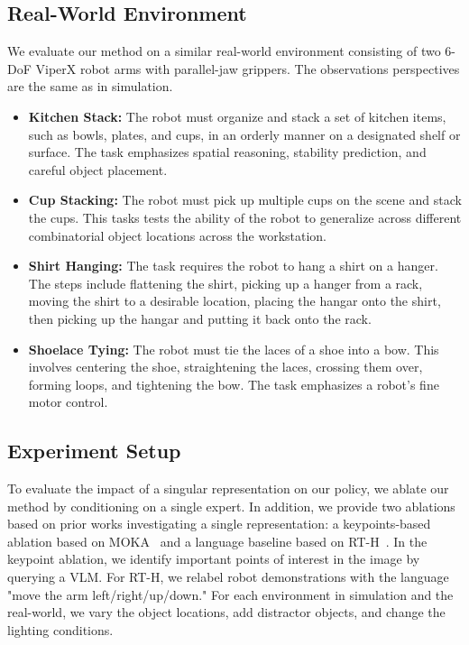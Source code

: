 \documentclass[conference,dvipsnames]{IEEEtran}
\begin{document}
\subsection{Real-World Environment}
We evaluate our method on a similar real-world environment consisting of two 6-DoF ViperX robot arms with parallel-jaw grippers. The observations perspectives are the same as in simulation. 


\begin{itemize}
    \item \textbf{Kitchen Stack:} The robot must organize and stack a set of kitchen items, such as bowls, plates, and cups, in an orderly manner on a designated shelf or surface. The task emphasizes spatial reasoning, stability prediction, and careful object placement.

    \item \textbf{Cup Stacking:}  The robot must pick up multiple cups on the scene and stack the cups. This tasks tests the ability of the robot to generalize across different combinatorial object locations across the workstation.
    
    \item \textbf{Shirt Hanging:}  The task requires the robot to hang a shirt on a hanger. The steps include flattening the shirt, picking up a hanger from a rack, moving the shirt to a desirable location, placing the hangar onto the shirt, then picking up the hangar and putting it back onto the rack.

    \item \textbf{Shoelace Tying:} The robot must tie the laces of a shoe into a bow. This involves centering the shoe, straightening the laces, crossing them over, forming loops, and tightening the bow. The task emphasizes a robot's fine motor control.
\end{itemize}

\subsection{Experiment Setup}
To evaluate the impact of a singular representation on our policy, we ablate our method by conditioning on a single expert. In addition, we provide two ablations based on prior works investigating a single representation: a keypoints-based ablation based on MOKA~\cite{liu2024mokaopenworldroboticmanipulation} and a language baseline based on RT-H~\cite{belkhale2024rthactionhierarchiesusing}. In the keypoint ablation, we identify important points of interest in the image by querying a VLM. For RT-H, we relabel robot demonstrations with the language "move the arm left/right/up/down." For each environment in simulation and the real-world, we vary the object locations, add distractor objects, and change the lighting conditions.
\end{document}
